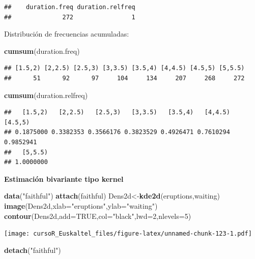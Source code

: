 \documentclass[]{book}
\newenvironment{Shaded}{\begin{snugshade}}{\end{snugshade}}
\newcommand{\KeywordTok}[1]{\textcolor[rgb]{0.13,0.29,0.53}{\textbf{#1}}}
\newcommand{\DataTypeTok}[1]{\textcolor[rgb]{0.13,0.29,0.53}{#1}}
\newcommand{\DecValTok}[1]{\textcolor[rgb]{0.00,0.00,0.81}{#1}}
\newcommand{\StringTok}[1]{\textcolor[rgb]{0.31,0.60,0.02}{#1}}
\newcommand{\OtherTok}[1]{\textcolor[rgb]{0.56,0.35,0.01}{#1}}
\newcommand{\NormalTok}[1]{#1}
\begin{document}
\begin{verbatim}
##    duration.freq duration.relfreq 
##              272                1
\end{verbatim}

Distribución de frecuencias acumuladas:

\begin{Shaded}
\begin{Highlighting}[]
\KeywordTok{cumsum}\NormalTok{(duration.freq)}
\end{Highlighting}
\end{Shaded}

\begin{verbatim}
## [1.5,2) [2,2.5) [2.5,3) [3,3.5) [3.5,4) [4,4.5) [4.5,5) [5,5.5) 
##      51      92      97     104     134     207     268     272
\end{verbatim}

\begin{Shaded}
\begin{Highlighting}[]
\KeywordTok{cumsum}\NormalTok{(duration.relfreq)}
\end{Highlighting}
\end{Shaded}

\begin{verbatim}
##   [1.5,2)   [2,2.5)   [2.5,3)   [3,3.5)   [3.5,4)   [4,4.5)   [4.5,5) 
## 0.1875000 0.3382353 0.3566176 0.3823529 0.4926471 0.7610294 0.9852941 
##   [5,5.5) 
## 1.0000000
\end{verbatim}

\textbf{Estimación bivariante tipo kernel}

\begin{Shaded}
\begin{Highlighting}[]
\KeywordTok{data}\NormalTok{(}\StringTok{"faithful"}\NormalTok{)}
\KeywordTok{attach}\NormalTok{(faithful)}
\NormalTok{Dens2d<-}\KeywordTok{kde2d}\NormalTok{(eruptions,waiting)}
\KeywordTok{image}\NormalTok{(Dens2d,}\DataTypeTok{xlab=}\StringTok{"eruptions"}\NormalTok{,}\DataTypeTok{ylab=}\StringTok{"waiting"}\NormalTok{)}
\KeywordTok{contour}\NormalTok{(Dens2d,}\DataTypeTok{add=}\OtherTok{TRUE}\NormalTok{,}\DataTypeTok{col=}\StringTok{"black"}\NormalTok{,}\DataTypeTok{lwd=}\DecValTok{2}\NormalTok{,}\DataTypeTok{nlevels=}\DecValTok{5}\NormalTok{)}
\end{Highlighting}
\end{Shaded}

\texttt{[image: cursoR\_Euskaltel\_files/figure-latex/unnamed-chunk-123-1.pdf]}

\begin{Shaded}
\begin{Highlighting}[]
\KeywordTok{detach}\NormalTok{(}\StringTok{"faithful"}\NormalTok{)}
\end{Highlighting}
\end{Shaded}
\end{document}
